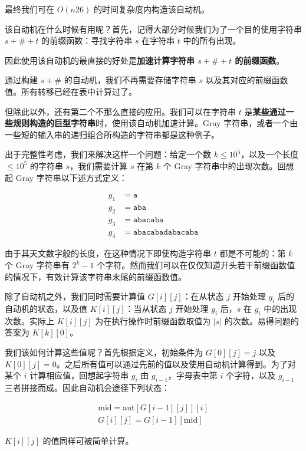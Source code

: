 最终我们可在 $O(n 26)$ 的时间复杂度内构造该自动机。

该自动机在什么时候有用呢？首先，记得大部分时候我们为了一个目的使用字符串 $s + \# + t$ 的前缀函数：寻找字符串 $s$ 在字符串 $t$ 中的所有出现。

因此使用该自动机的最直接的好处是\textbf{加速计算字符串 $s + \# + t$ 的前缀函数}。

通过构建 $s + \#$ 的自动机，我们不再需要存储字符串 $s$ 以及其对应的前缀函数值。所有转移已经在表中计算过了。

但除此以外，还有第二个不那么直接的应用。我们可以在字符串 $t$ 是\textbf{某些通过一些规则构造的巨型字符串}时，使用该自动机加速计算。Gray 字符串，或者一个由一些短的输入串的递归组合所构造的字符串都是这种例子。

出于完整性考虑，我们来解决这样一个问题：给定一个数 $k \le 10^5$，以及一个长度 $\le 10^5$ 的字符串 $s$，我们需要计算 $s$ 在第 $k$ 个 Gray 字符串中的出现次数。回想起 Gray 字符串以下述方式定义：

$$
\begin{aligned}
g_1 &= \mathtt{a}\\
g_2 &= \mathtt{aba}\\
g_3 &= \mathtt{abacaba}\\
g_4 &= \mathtt{abacabadabacaba}
\end{aligned}
$$

由于其天文数字般的长度，在这种情况下即使构造字符串 $t$ 都是不可能的：第 $k$ 个 Gray 字符串有 $2^k - 1$ 个字符。然而我们可以在仅仅知道开头若干前缀函数值的情况下，有效计算该字符串末尾的前缀函数值。

除了自动机之外，我们同时需要计算值 $G[i][j]$：在从状态 $j$ 开始处理 $g_i$ 后的自动机的状态，以及值 $K[i][j]$：当从状态 $j$ 开始处理 $g_i$ 后，$s$ 在 $g_i$ 中的出现次数。实际上 $K[i][j]$ 为在执行操作时前缀函数取值为 $|s|$ 的次数。易得问题的答案为 $K[k][0]$。

我们该如何计算这些值呢？首先根据定义，初始条件为 $G[0][j] = j$ 以及 $K[0][j] = 0$。之后所有值可以通过先前的值以及使用自动机计算得到。为了对某个 $i$ 计算相应值，回想起字符串 $g_i$ 由 $g_{i - 1}$，字母表中第 $i$ 个字符，以及 $g_{i - 1}$ 三者拼接而成。因此自动机会途径下列状态：

$$
\begin{gathered}
\text{mid} = \text{aut}[G[i - 1][j]][i] \\
G[i][j] = G[i - 1][\text{mid}]
\end{gathered}
$$

$K[i][j]$ 的值同样可被简单计算。

